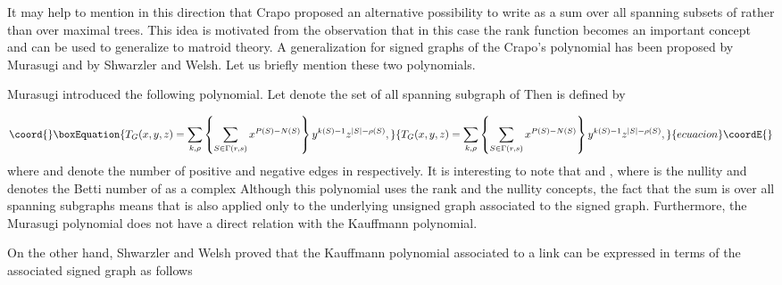 \documentclass[a4paper,12pt]{article}
\begin{document}
It may help to mention in this direction that Crapo\coordHE{} proposed an
alternative possibility to write \coordHE{} as a sum over all spanning subsets
of \coordHE{} rather than over maximal trees. This idea is motivated from the
observation that in this case the rank function \myHighlight{$\rho $}\coordHE{} becomes an important
concept and can be used to generalize \coordHE{} to matroid theory. A
generalization for signed graphs of the Crapo's polynomial has been proposed
by Murasugi\coordHE{} and by Shwarzler and Welsh.\coordHE{} Let us briefly mention
these two polynomials.

Murasugi introduced the following polynomial. Let \coordHE{} denote the
set of all spanning subgraph \coordHE{} of \coordHE{} Then \coordHE{} is defined by

\begin{equation}\coord{}\boxEquation{
T_{G}(x,y,z)=\sum_{k,\rho }\left\{ \sum_{S\in \Gamma
(r,s)}x^{P(S)-N(S)}\right\} y^{k(S)-1}z^{\mid S\mid -\rho (S)},  \label{22}
}{
T_{G}(x,y,z)=\sum_{k,\rho }\left\{ \sum_{S\in \Gamma
(r,s)}x^{P(S)-N(S)}\right\} y^{k(S)-1}z^{\mid S\mid -\rho (S)},  }{ecuacion}\coordE{}\end{equation}
where \coordHE{} and \coordHE{} denote the number of positive and negative edges in \coordHE{} respectively. It is interesting to note that \coordHE{} and \coordHE{}, where \coordHE{} is the nullity and \coordHE{}
denotes the \coordHE{} Betti number of \coordHE{} as a \coordHE{}complex\coordHE{} Although this
polynomial uses the rank and the nullity concepts, the fact that the sum is
over all spanning subgraphs \myHighlight{$\Gamma $}\coordHE{} means that \coordHE{} is also
applied only to the underlying unsigned graph \coordHE{} associated to the signed
graph. Furthermore, the Murasugi polynomial does not have a direct relation
with the Kauffmann polynomial.

On the other hand, Shwarzler and Welsh\coordHE{} proved that the Kauffmann
polynomial associated to a link \coordHE{} can be expressed in terms of the
associated signed graph \coordHE{} as follows
\end{document}

